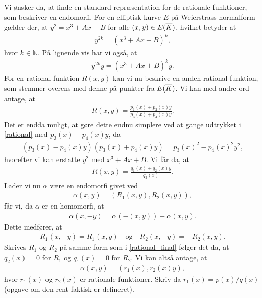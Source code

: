 Vi ønsker da, at finde en standard repræsentation for de rationale funktioner, som
beskriver en endomorfi. For en elliptisk kurve $E$ på Weierstrass normalform gælder
der, at $y^2 = x^3 + Ax + B$ for alle $(x, y) \in E(\overline{K})$, hvilket betyder at
\begin{align*}
	y^{2k} = (x^3 + Ax + B)^k,
\end{align*}
hvor $k \in \mathbb{N}$. På lignende vis har vi også, at 
\begin{align*}
	y^{2k} y = (x^3 + Ax + B)^k y.
\end{align*}
For en rational funktion $R(x, y)$ kan vi nu beskrive en anden rational funktion,
som stemmer overens med denne på punkter fra $E(\overline{K})$. Vi kan med andre ord antage,
at 
\begin{align}
	\label{rational}
	R(x, y) = \frac{p_1(x) + p_2(x)y}{p_3(x)+p_4(x)y}.
\end{align}
Det er endda muligt, at gøre dette endnu simplere ved at gange udtrykket i \eqref{rational}
med $p_3(x)-p_4(x)y$, da 
\begin{align*}
	(p_3(x) - p_4(x)y)(p_3(x)+p_4(x)y) = p_3(x)^2 - p_4(x)^2 y^2,
\end{align*}
hvorefter vi kan erstatte $y^2$ med $x^3+Ax+B$. Vi får da, at 
\begin{align}
	\label{rational_final}
	R(x, y) = \frac{q_1(x) + q_2(x)y}{q_3(x)}.
\end{align}
Lader vi nu $\alpha$ være en endomorfi givet ved
\begin{align*}
	\alpha(x, y) = (R_1(x, y), R_2(x, y)),
\end{align*}
får vi, da $\alpha$ er en homomorfi, at 
\begin{align*}
	\alpha(x, -y) = \alpha(-(x, y)) - \alpha(x, y).
\end{align*}
Dette medfører, at 
\begin{align*}
	R_1(x, -y) = R_1(x, y) \quad \text{og} \quad R_2(x, -y) = -R_2(x, y).
\end{align*}
Skrives $R_1$ og $R_2$ på samme form som i \eqref{rational_final} følger det da, at 
$q_2(x)=0$ for $R_1$ og $q_1(x)=0$ for $R_2$. Vi kan altså antage, at 
\begin{align*}
	\alpha(x, y) = (r_1(x), r_2(x)y),
\end{align*}
hvor $r_1(x)$ og $r_2(x)$ er rationale funktioner. Skriv da $r_1(x)=p(x)/q(x)$ (opgave om
den rent faktisk er defineret).
















